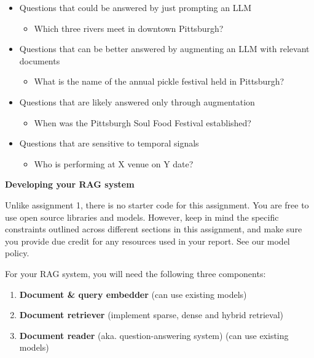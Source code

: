 \documentclass[11pt]{article}
\newcommand{\problem}[1]{%
  \vspace{1em}
  \noindent\colorbox{headerblue}{\parbox{\dimexpr\textwidth-2\fboxsep}{%
    \vspace{2pt}\textbf{\large #1}\vspace{2pt}}}
  \vspace{0.6em}
}
\newcommand{\subsec}[1]{%
  \vspace{0.8em}
  \noindent{\sffamily\bfseries\color{mauve} #1}
  \vspace{0.35em}
  \par
}
\begin{document}
\begin{itemize}[nosep, leftmargin=2em]
  \item Questions that could be answered by just prompting an LLM
    \begin{itemize}[nosep, leftmargin=1.6em]
      \item Which three rivers meet in downtown Pittsburgh?
    \end{itemize}
  \item Questions that can be better answered by augmenting an LLM with relevant documents
    \begin{itemize}[nosep, leftmargin=1.6em]
      \item What is the name of the annual pickle festival held in Pittsburgh?
    \end{itemize}
  \item Questions that are likely answered only through augmentation
    \begin{itemize}[nosep, leftmargin=1.6em]
      \item When was the Pittsburgh Soul Food Festival established?
    \end{itemize}
  \item Questions that are sensitive to temporal signals
    \begin{itemize}[nosep, leftmargin=1.6em]
      \item Who is performing at X venue on Y date?
    \end{itemize}
\end{itemize}

\problem{Developing your RAG system}

\noindent Unlike assignment 1, there is no starter code for this assignment. You are free to use open
source libraries and models. However, keep in mind the specific constraints outlined across different
sections in this assignment, and make sure you provide due credit for any resources used in your
report. See our model policy.

\subsec{Implementation Requirements}

\noindent For your RAG system, you will need the following three components:

\begin{enumerate}[nosep, leftmargin=2em]
  \item \textbf{Document \& query embedder} (can use existing models)
  \item \textbf{Document retriever} (implement sparse, dense and hybrid retrieval)
  \item \textbf{Document reader} (aka. question-answering system) (can use existing models)
\end{enumerate}
\end{document}
